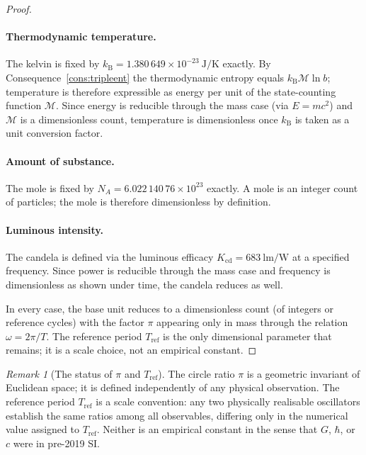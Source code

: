 \documentclass[11pt,twocolumn,a4paper]{article}
\theoremstyle{axiomstyle}
\theoremstyle{conseqstyle}
\theoremstyle{definition}
\theoremstyle{remark}
\newtheorem*{remark}{Remark}
\newcommand{\kB}{k_{\mathrm{B}}}
\newcommand{\Depth}{\mathcal{M}}
\begin{document}
\begin{proof}
\paragraph{Thermodynamic temperature.} The kelvin is fixed by $k_{\mathrm{B}}=1.380\,649\times10^{-23}~\mathrm{J/K}$ exactly. By Consequence~\ref{cons:tripleent} the thermodynamic entropy equals $\kB\Depth\ln b$; temperature is therefore expressible as energy per unit of the state-counting function $\Depth$. Since energy is reducible through the mass case (via $E=mc^{2}$) and $\Depth$ is a dimensionless count, temperature is dimensionless once $k_{\mathrm{B}}$ is taken as a unit conversion factor.

\paragraph{Amount of substance.} The mole is fixed by $N_{A}=6.022\,140\,76\times10^{23}$ exactly. A mole is an integer count of particles; the mole is therefore dimensionless by definition.

\paragraph{Luminous intensity.} The candela is defined via the luminous efficacy $K_{\mathrm{cd}}=683~\mathrm{lm/W}$ at a specified frequency. Since power is reducible through the mass case and frequency is dimensionless as shown under time, the candela reduces as well.

In every case, the base unit reduces to a dimensionless count (of integers or reference cycles) with the factor $\pi$ appearing only in mass through the relation $\omega=2\pi/T$. The reference period $T_{\mathrm{ref}}$ is the only dimensional parameter that remains; it is a scale choice, not an empirical constant.
\end{proof}

\begin{remark}[The status of $\pi$ and $T_{\mathrm{ref}}$]
The circle ratio $\pi$ is a geometric invariant of Euclidean space; it is defined independently of any physical observation. The reference period $T_{\mathrm{ref}}$ is a scale convention: any two physically realisable oscillators establish the same ratios among all observables, differing only in the numerical value assigned to $T_{\mathrm{ref}}$. Neither is an empirical constant in the sense that $G$, $\hbar$, or $c$ were in pre-2019 SI.
\end{remark}
\end{document}
